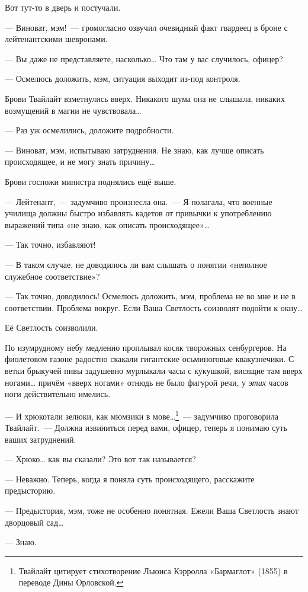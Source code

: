 \documentclass[twoside,a5paper,12pt]{extbook}
\begin{document}
Вот тут-то в дверь и постучали.

— Виноват, мэм! — громогласно озвучил очевидный факт гвардеец в броне с лейтенантскими шевронами.

— Вы даже не представляете, насколько… Что там у вас случилось, офицер?

— Осмелюсь доложить, мэм, ситуация выходит из-под контроля.

Брови Твайлайт взметнулись вверх. Никакого шума она не слышала, никаких возмущений в магии не чувствовала…

— Раз уж осмелились, доложите подробности.

— Виноват, мэм, испытываю затруднения. Не знаю, как лучше описать происходящее, и не могу знать причину…

Брови госпожи министра поднялись ещё выше.

— Лейтенант, — задумчиво произнесла она. — Я полагала, что военные училища должны быстро избавлять кадетов от привычки к употреблению выражений типа «не знаю, как описать происходящее»…

— Так точно, избавляют!

— В таком случае, не доводилось ли вам слышать о понятии «неполное служебное соответствие»?

— Так точно, доводилось! Осмелюсь доложить, мэм, проблема не во мне и не в соответствии. Проблема вокруг. Если Ваша Светлость соизволят подойти к окну…

Её Светлость соизволили.

По изумрудному небу медленно проплывал косяк творожных сенбургеров. На фиолетовом газоне радостно скакали гигантские осьминоговые квакузнечики. С ветки брыкучей пивы задушевно мурлыкали часы с кукушкой, висящие там вверх ногами… причём «вверх ногами» отнюдь не было фигурой речи, у \textit{этих} часов ноги действительно имелись.

— И хрюкотали зелюки, как мюмзики в мове…\footnote{Твайлайт цитирует стихотворение Льюиса Кэрролла «Бармаглот» (1855) в переводе Дины Орловской.} — задумчиво проговорила Твайлайт. — Должна извиниться перед вами, офицер, теперь я понимаю суть ваших затруднений.

— Хрюко… как вы сказали? Это вот так называется?

— Неважно. Теперь, когда я поняла суть происходящего, расскажите предысторию.

— Предыстория, мэм, тоже не особенно понятная. Ежели Ваша Светлость знают дворцовый сад…

— Знаю.
\end{document}

